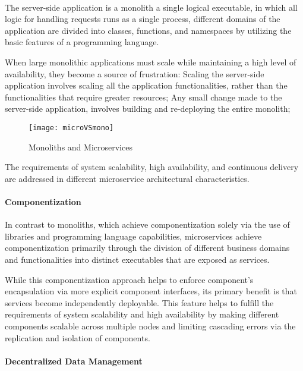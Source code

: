 \paragraph{}

The server-side application is a monolith a single logical executable, in which all logic for handling requests runs as a single process,
different domains of the application are divided into classes, functions, and namespaces by utilizing the basic features of a programming language.

When large monolithic applications must scale while maintaining a high level of availability, they become a source of frustration:
Scaling the server-side application involves scaling all the application functionalities, rather than the functionalities that require greater resources;
Any small change made to the server-side application, involves building and re-deploying the entire monolith;

\begin{figure}[htbp]
    \centering
    \texttt{[image: microVSmono]}
    \caption{Monoliths and Microservices \cite{microservices}}
    \label{fig:monoliths and microservices}
\end{figure}

The requirements of system scalability, high availability, and continuous delivery are addressed in different microservice architectural characteristics.

\paragraph{Componentization}

In contrast to monoliths, which achieve componentization solely via the use of libraries and programming language capabilities,
microservices achieve componentization primarily through the division of different business domains and functionalities into distinct executables
that are exposed as services.

While this componentization approach helps to enforce component's encapsulation via more explicit component interfaces,
its primary benefit is that services become independently deployable.
This feature helps to fulfill the requirements of system scalability and high availability by
making different components scalable across multiple nodes and limiting cascading errors via the replication and isolation of components.

\paragraph{Decentralized Data Management}

